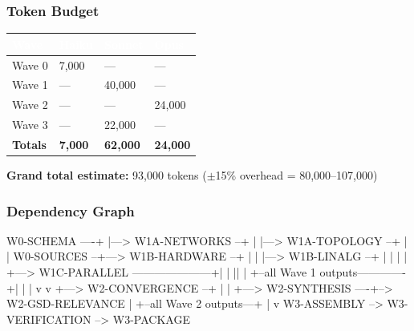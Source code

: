 \documentclass[11pt,letterpaper]{article}
\newcommand{\tableheader}[1]{\textbf{\sffamily\textcolor{white}{#1}}}
\begin{document}
\subsubsection{Token Budget}

\begin{center}
\begin{tabularx}{\textwidth}{L{3cm}C{2cm}C{2cm}C{2cm}}
\toprule
{}
\tableheader{Wave} & \tableheader{Haiku} & \tableheader{Sonnet} & \tableheader{Opus} \\
\midrule
Wave 0 & 7,000 & --- & --- \\
Wave 1 & --- & 40,000 & --- \\
Wave 2 & --- & --- & 24,000 \\
Wave 3 & --- & 22,000 & --- \\
\midrule
\textbf{Totals} & \textbf{7,000} & \textbf{62,000} & \textbf{24,000} \\
\bottomrule
\end{tabularx}
\end{center}

\textbf{Grand total estimate:} 93,000 tokens ($\pm$15\% overhead = 80,000--107,000)

\subsubsection{Dependency Graph}

\begin{asciibox}
W0-SCHEMA ----+
              |---> W1A-NETWORKS --+
              |                     |---> W1A-TOPOLOGY --+
              |                                          |
W0-SOURCES --+---> W1B-HARDWARE --+                     |
              |                     |---> W1B-LINALG --+ |
              |                                        | |
              +---> W1C-PARALLEL ---------------------+| |
                                                      || |
                    +--all Wave 1 outputs-------------+| |
                    |                                  v v
                    +---> W2-CONVERGENCE --+
                    |                      |
                    +---> W2-SYNTHESIS ----+--> W2-GSD-RELEVANCE
                                                      |
                              +--all Wave 2 outputs---+
                              |
                              v
                    W3-ASSEMBLY --> W3-VERIFICATION --> W3-PACKAGE
\end{asciibox}
\end{document}
